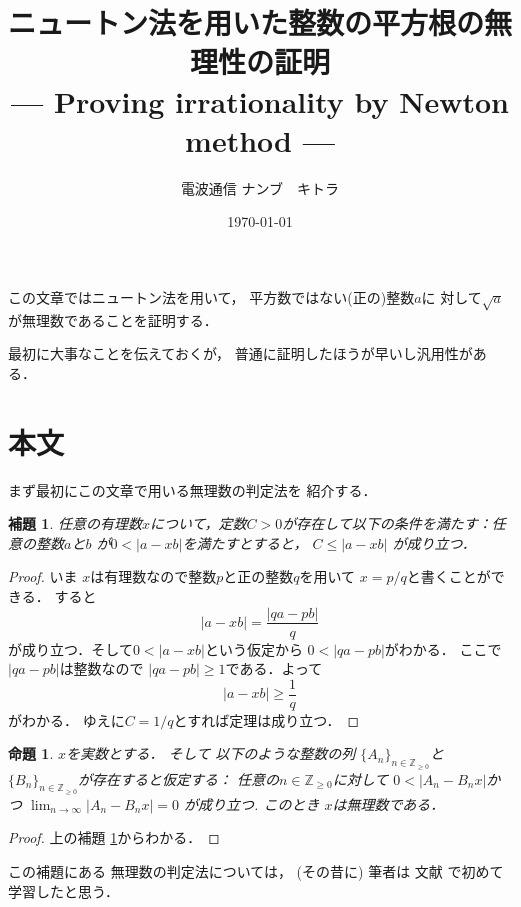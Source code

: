 \documentclass[leqno, a4paper, 12pt]{jsarticle}
\title{ニュートン法を用いた整数の平方根の無理性の証明
\large{\\--- Proving irrationality by Newton method ---}
}
\author{電波通信 ナンブ　キトラ}
\date{\today}
\newtheorem{prop}[thm]{命題}
\newtheorem{lem}[thm]{補題}
\newcommand{\zz}{\mathbb{Z}}
\begin{document}
\maketitle

この文章ではニュートン法を用いて，
平方数ではない(正の)整数$a$に
対して$\sqrt{a}$
が無理数であることを証明する．

最初に大事なことを伝えておくが，
普通に証明したほうが早いし汎用性がある．

\section{本文}
まず最初にこの文章で用いる無理数の判定法を
紹介する．

\begin{lem}\label{lem:Cq}
任意の有理数$x$について，定数$C>0$が存在して以下の条件を満たす：任意の整数$a$と$b$
が$0<|a-xb|$を満たすとすると，
$C\le |a-xb|$
が成り立つ．
\end{lem}
\begin{proof}
いま
$x$は有理数なので整数$p$と正の整数$q$を用いて
$x=p/q$と書くことができる．
すると
\[
|a-xb|
=\frac{|qa-pb|}{q}
\]
が成り立つ．そして$0<|a-xb|$という仮定から
$0<|qa-pb|$がわかる．
ここで
$|qa-pb|$は整数なので
$|qa-pb|\ge 1$である．よって
\[
|a-xb|\ge \frac{1}{q}
\]
がわかる．
ゆえに$C=1/q$とすれば定理は成り立つ．
\end{proof}

\begin{prop}\label{prop:irr}
$x$を実数とする．
そして
以下のような整数の列
$\{A_{n}\}_{n\in \zz_{\ge 0}}$と
$\{B_{n}\}_{n\in \zz_{\ge 0}}$が存在すると仮定する：
任意の$n\in \zz_{\ge 0}$に対して
$0<|A_{n}-B_{n}x|$かつ
$\lim_{n\to \infty}|A_{n}-B_{n}x|=0$
が成り立つ.
このとき
$x$は無理数である．
\end{prop}
\begin{proof}
上の補題
\ref{lem:Cq}からわかる．
\end{proof}

この補題にある
無理数の判定法については，
(その昔に)
筆者は
文献\cite[p.1]{shio}
で初めて学習したと思う．
\end{document}
